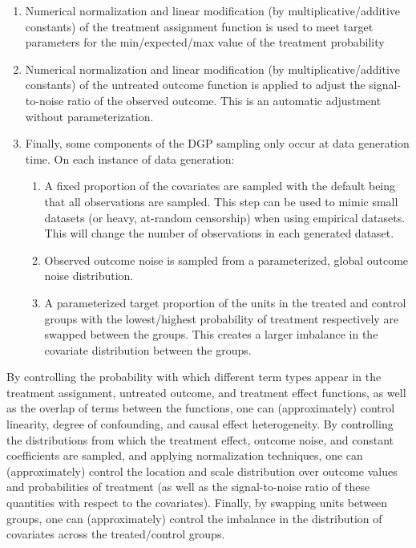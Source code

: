 \documentclass[../main.tex]{subfiles}
\begin{document}
\begin{enumerate}
    \item Numerical normalization and linear modification (by multiplicative/additive constants) of the treatment assignment function is used to meet target parameters for the min/expected/max value of the treatment probability

    \item Numerical normalization and linear modification (by multiplicative/additive constants) of the untreated outcome function is applied to adjust the signal-to-noise ratio of the observed outcome. This is an automatic adjustment without parameterization.

    \item Finally, some components of the DGP sampling only occur at data generation time. On each instance of data generation:

    \begin{enumerate}
        \item A fixed proportion of the covariates are sampled with the default being that all observations are sampled. This step can be used to mimic small datasets (or heavy, at-random censorship) when using empirical datasets. This will change the number of observations in each generated dataset.
        \item Observed outcome noise is sampled from a parameterized, global outcome noise distribution.
        \item A parameterized target proportion of the units in the treated and control groups with the lowest/highest probability of treatment respectively are swapped between the groups. This creates a larger imbalance in the covariate distribution between the groups.
    \end{enumerate}

\end{enumerate}

By controlling the probability with which different term types appear in the treatment assignment, untreated outcome, and treatment effect functions, as well as the overlap of terms between the functions, one can (approximately) control linearity, degree of confounding, and causal effect heterogeneity. By controlling the distributions from which the treatment effect, outcome noise, and constant coefficients are sampled, and applying normalization techniques, one can (approximately) control the location and scale distribution over outcome values and probabilities of treatment (as well as the signal-to-noise ratio of these quantities with respect to the covariates). Finally, by swapping units between groups, one can (approximately) control the imbalance in the distribution of covariates across the treated/control groups.
\end{document}

